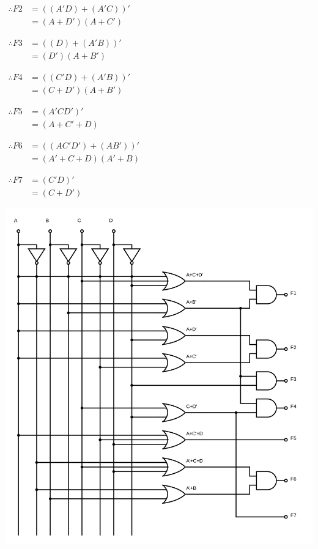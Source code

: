 \documentclass[12pt]{book}
\newenvironment{indented}[1] {
	\begin{list}{}{\setlength{\leftmargin}{#1}}
		\item[]
	}{\end{list}}
\begin{document}
\begin{indented}{5mm}
		$\begin{aligned}
			\therefore F2 &=((A'D)+(A'C))' \\
			&= (A+D')(A+C')
		\end{aligned}$
		
		$\begin{aligned}
			\therefore F3 &=((D)+(A'B))' \\
			&= (D')(A+B')
		\end{aligned}$
		
		$\begin{aligned}
			\therefore F4 &=((C'D)+(A'B))' \\
			&= (C+D')(A+B')
		\end{aligned}$
		
		$\begin{aligned}
			\therefore F5 &=(A'CD')' \\
			&= (A+C'+D)
		\end{aligned}$
		
		$\begin{aligned}
			\therefore F6 &=((AC'D')+(AB'))' \\
			&= (A'+C+D)(A'+B)
		\end{aligned}$
		
		$\begin{aligned}
			\therefore F7 &=(C'D)' \\
			&= (C+D')
		\end{aligned}$
		
		\includegraphics[width=5.5in]{q3_seven-segment}
	\end{indented}
\end{document}

